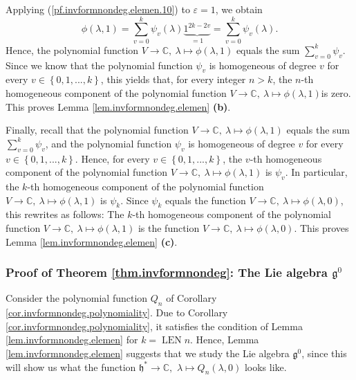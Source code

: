 \documentclass
[numbers=enddot,12pt,final,onecolumn,german,notitlepage]{scrartcl}%
\theoremstyle{definition}
\begin{document}
Applying (\ref{pf.invformnondeg.elemen.10}) to $\varepsilon=1$, we obtain%
\[
\phi\left(  \lambda,1\right)  =\sum\limits_{v=0}^{k}\psi_{v}\left(
\lambda\right)  \underbrace{1^{2k-2v}}_{=1}=\sum\limits_{v=0}^{k}\psi
_{v}\left(  \lambda\right)  .
\]
Hence, the polynomial function $V\rightarrow\mathbb{C},\ \lambda\mapsto
\phi\left(  \lambda,1\right)  $ equals the sum $\sum\limits_{v=0}^{k}\psi_{v}%
$. Since we know that the polynomial function $\psi_{v}$ is homogeneous of
degree $v$ for every $v\in\left\{  0,1,...,k\right\}  $, this yields that, for
every integer $n>k$, the $n$-th homogeneous component of the polynomial
function $V\rightarrow\mathbb{C},\ \lambda\mapsto\phi\left(  \lambda,1\right)
$is zero. This proves Lemma \ref{lem.invformnondeg.elemen} \textbf{(b)}.

Finally, recall that the polynomial function $V\rightarrow\mathbb{C}%
,\ \lambda\mapsto\phi\left(  \lambda,1\right)  $ equals the sum $\sum
\limits_{v=0}^{k}\psi_{v}$, and the polynomial function $\psi_{v}$ is
homogeneous of degree $v$ for every $v\in\left\{  0,1,...,k\right\}  $. Hence,
for every $v\in\left\{  0,1,...,k\right\}  $, the $v$-th homogeneous component
of the polynomial function $V\rightarrow\mathbb{C},\ \lambda\mapsto\phi\left(
\lambda,1\right)  $ is  $\psi_{v}$. In particular, the $k$-th homogeneous
component of the polynomial function $V\rightarrow\mathbb{C},\ \lambda
\mapsto\phi\left(  \lambda,1\right)  $ is $\psi_{k}$. Since $\psi_{k}$ equals
the function $V\rightarrow\mathbb{C},\ \lambda\mapsto\phi\left(
\lambda,0\right)  $, this rewrites as follows: The $k$-th homogeneous
component of the polynomial function $V\rightarrow\mathbb{C},\ \lambda
\mapsto\phi\left(  \lambda,1\right)  $ is the function $V\rightarrow
\mathbb{C},\ \lambda\mapsto\phi\left(  \lambda,0\right)  $. This proves Lemma
\ref{lem.invformnondeg.elemen} \textbf{(c)}.

\subsubsection{Proof of Theorem \ref{thm.invformnondeg}: The Lie algebra
$\mathfrak{g}^{0}$}

Consider the polynomial function $Q_{n}$ of Corollary
\ref{cor.invformnondeg.polynomiality}. Due to Corollary
\ref{cor.invformnondeg.polynomiality}, it satisfies the condition of Lemma
\ref{lem.invformnondeg.elemen} for $k=\operatorname*{LEN}n$. Hence, Lemma
\ref{lem.invformnondeg.elemen} suggests that we study the Lie algebra
$\mathfrak{g}^{0}$, since this will show us what the function $\mathfrak{h}%
^{\ast}\rightarrow\mathbb{C},$ $\lambda\mapsto Q_{n}\left(  \lambda,0\right)
$ looks like.
\end{document}
